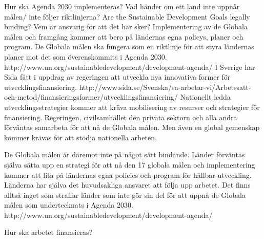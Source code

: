 \documentclass{report}
\begin{document}
Hur ska Agenda 2030 implementeras? Vad händer om ett land inte uppnår målen/ inte följer riktlinjerna? Are the Sustainable Development Goals legally binding? 
Vem är ansvarig för att det här sker?
Implementering av de Globala målen och framgång kommer att bero på ländernas egna policys, planer och program. De Globala målen ska fungera som en riktlinje för att styra ländernas planer mot det som överenskommits i Agenda 2030.  http://www.un.org/sustainabledevelopment/development-agenda/
I Sverige har Sida fått i uppdrag av regeringen att utveckla nya innovativa former för utvecklingsfinansiering. http://www.sida.se/Svenska/sa-arbetar-vi/Arbetssatt-och-metod/finansieringsformer/utvecklingsfinansiering/
Nationellt ledda utvecklingsstrategier kommer att kräva mobilisering av resurser och strategier för finansiering. Regeringen, civilsamhället den privata sektorn och alla andra förväntas samarbeta för att nå de Globala målen. Men även en global gemenskap kommer krävas för att stödja nationella arbeten. 

De Globala målen är däremot inte på något sätt bindande. Länder förväntas själva sätta upp en strategi för att nå den 17 globala målen och implementering kommer att lita på ländernas egna policies och program för hållbar utveckling. Länderna har själva det huvudsakliga ansvaret att följa upp arbetet. Det finns alltså inget som straffar länder som inte gör sin del för att uppnå de Globala målen som undertecknats i Agenda 2030. http://www.un.org/sustainabledevelopment/development-agenda/


Hur ska arbetet finansieras?
\end{document}
